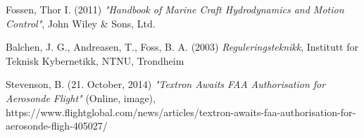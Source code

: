 \begin{thebibliography}{25}
	
	Fossen, Thor I. (2011)
	\emph{"Handbook of Marine Craft Hydrodynamics and Motion Control"},
	John Wiley \& Sons, Ltd.
	
	
	Balchen, J. G., Andreasen, T., Foss, B. A. (2003)
	\emph{Reguleringsteknikk},
	Institutt for Teknisk Kybernetikk, NTNU, Trondheim
	
	
	Stevenson, B. (21. October, 2014)
	\emph{"Textron Awaits FAA Authorisation for Aerosonde Flight"} (Online, image),
	https://www.flightglobal.com/news/articles/textron-awaits-faa-authorisation-for-aerosonde-fligh-405027/
	
\end{thebibliography}